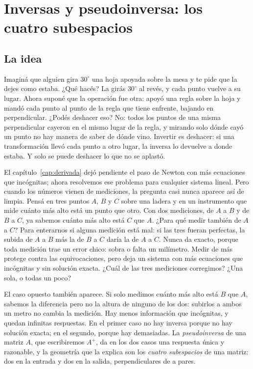 \chapter{Inversas y pseudoinversa: los cuatro subespacios}\label{cap:inversas}

\section{La idea}

Imaginá que alguien gira \(30^\circ\) una hoja apoyada sobre la mesa y te pide que la dejes
como estaba. ¿Qué hacés? La girás \(30^\circ\) al revés, y cada punto vuelve a su lugar. Ahora
suponé que la operación fue otra: apoyó una regla sobre la hoja y mandó cada punto al punto
de la regla que tiene enfrente, bajando en perpendicular. ¿Podés deshacer eso? No: todos los puntos de una misma
perpendicular cayeron en el mismo lugar de la regla, y mirando solo dónde cayó un punto no hay manera de saber de dónde vino. Invertir es deshacer:
si una transformación llevó cada punto a otro lugar, la inversa lo devuelve a donde estaba.
Y solo se puede deshacer lo que no se aplastó.

El capítulo~\ref{cap:derivada} dejó pendiente el paso de Newton con más ecuaciones que
incógnitas; ahora resolvemos ese problema para cualquier sistema lineal. Pero cuando los
números vienen de mediciones, la pregunta casi nunca aparece así de limpia. Pensá en tres
puntos \(A\), \(B\) y \(C\) sobre una ladera y en un instrumento que mide cuánto más alto está
un punto que otro. Con dos mediciones, de \(A\) a \(B\) y de \(B\) a \(C\), ya sabemos cuánto
más alto está \(C\) que \(A\). ¿Para qué medir también de \(A\) a \(C\)? Para enterarnos si
alguna medición está mal: si las tres fueran perfectas, la subida de \(A\) a \(B\) más la de
\(B\) a \(C\) daría la de \(A\) a \(C\). Nunca da exacto, porque toda medición trae un error
chico: sobra o falta un milímetro. Medir de más protege contra las equivocaciones, pero deja
un sistema con más ecuaciones que incógnitas y sin solución exacta. ¿Cuál de las tres
mediciones corregimos? ¿Una sola, o todas un poco?

El caso opuesto también aparece. Si solo medimos cuánto más alto está \(B\) que \(A\), sabemos
la diferencia pero no la altura de ninguno de los dos: subirlos a ambos un metro no cambia la
medición. Hay menos información que incógnitas, y quedan infinitas respuestas. En el primer
caso no hay inversa porque no hay solución exacta; en el segundo, porque hay demasiadas. La
\emph{pseudoinversa} de una matriz \(A\), que escribiremos \(A^{+}\), da en los dos casos una
respuesta única y razonable, y la geometría que la explica son los \emph{cuatro subespacios}
de una matriz: dos en la entrada y dos en la salida, perpendiculares de a pares.


